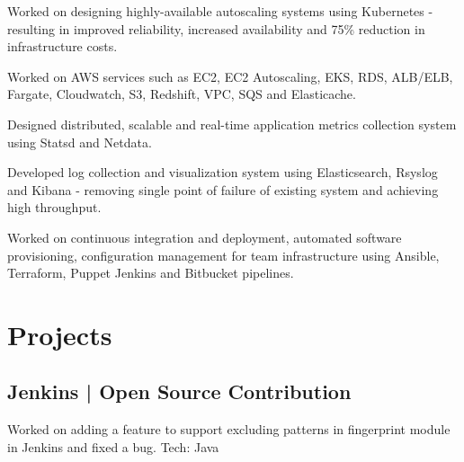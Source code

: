 \documentclass[]{deedy-resume-openfont}
\begin{document}
\begin{minipage}[t]{0.66\textwidth}
\textbullet{} Worked on designing highly-available autoscaling systems using Kubernetes
- resulting in improved reliability, increased availability and 75\% reduction in infrastructure costs.

\textbullet{} Worked on AWS services such as EC2, EC2 Autoscaling, EKS, RDS, ALB/ELB, Fargate, Cloudwatch, 
S3, Redshift, VPC, SQS and Elasticache.

\sectionsep

\textbullet{} Designed distributed, scalable and real-time application metrics collection 
system using Statsd and Netdata.

\textbullet{} Developed log collection and visualization system using Elasticsearch, Rsyslog and Kibana -
removing single point of failure of existing system and achieving high throughput.

\textbullet{} Worked on continuous integration and deployment, automated software provisioning, 
configuration management for team infrastructure using Ansible, Terraform, Puppet Jenkins and Bitbucket pipelines.


\sectionsep


\section{Projects}

\subsection{Jenkins \hspace*{1pt} | \hspace*{1pt} Open Source Contribution}
\textbullet{} Worked on adding a feature to support excluding patterns in fingerprint module in Jenkins and fixed a bug. Tech: Java
\sectionsep


\end{minipage}
\end{document}

